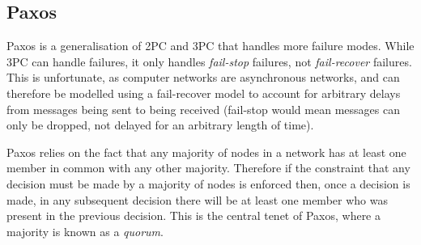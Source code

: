 \documentclass[12pt,twoside,notitlepage]{report}
\begin{document}
\subsection*{Paxos}

%
%

Paxos is a generalisation of 2PC and 3PC that handles more failure modes\cite{gray2006}. While 3PC
can handle failures, it only handles \emph{fail-stop} failures, not \emph{fail-recover} failures.
This is unfortunate, as computer networks are asynchronous networks, and can therefore be modelled
using a fail-recover model to account for arbitrary delays from messages being sent to being
received (fail-stop would mean messages can only be dropped, not delayed for an arbitrary length
of time).

Paxos relies on the fact that any majority of nodes in a network has at least one member in common
with any other majority. Therefore if the constraint that any decision must be made by a majority
of nodes is enforced then, once a decision is made, in any subsequent decision there will be at
least one member who was present in the previous decision. This is the central tenet of Paxos,
where a majority is known as a \emph{quorum}.
\end{document}
